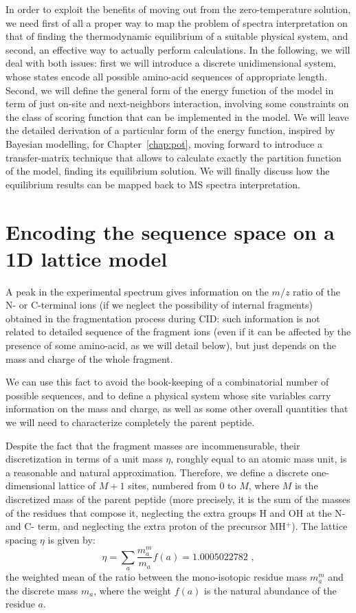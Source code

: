 In order to exploit the benefits of moving out from the zero-temperature
solution, we need first of all a proper way to map the problem of spectra
interpretation on that of finding the thermodynamic equilibrium of a suitable
physical system, and second, an effective way to actually perform calculations.
In the following, we will deal with both issues: first we will introduce a
discrete unidimensional system, whose states encode all possible amino-acid
sequences of appropriate length. Second, we will define the general form of the
energy function of the model in term of just on-site and next-neighbors
interaction, involving some constraints on the  class of scoring function that
can be implemented in the model. We will leave the detailed derivation of a
particular form of the energy function, inspired by Bayesian modelling, for
Chapter~\ref{chap:pot}, moving forward to introduce a transfer-matrix technique that
allows to calculate exactly the partition function of the model, finding its
equilibrium solution. We will finally discuss how the equilibrium results can be
mapped back to  MS spectra interpretation.

\section{Encoding the sequence space on a 1D lattice model}
\label{sec:variables}

A peak in the experimental spectrum gives information on the $m/z$ ratio of the
N- or C-terminal ions (if we neglect the possibility of internal fragments)
obtained in the fragmentation process during CID: such information is not
related to detailed sequence of the fragment ions (even if it can be affected by
the presence of some amino-acid, as we will detail below), but just depends on
the mass and charge of the whole fragment.

We can use this fact to avoid the book-keeping of a combinatorial number of
possible sequences, and to define a physical system whose site variables carry
information on the mass and charge, as well as some other overall quantities
that we will need to characterize completely the parent peptide.
  
Despite the fact that the fragment masses are incommensurable, their
discretization in terms of a unit mass $\eta$, roughly equal to an atomic mass
unit, is a reasonable and natural approximation. Therefore, we define a discrete
one-dimensional lattice  of $M+1$ sites, numbered from $0$ to $M$, where $M$ is
the discretized mass of the parent peptide (more precisely, it is the sum of the
masses of the residues that compose it, neglecting the extra groups H and OH at
the N- and C- term, and neglecting the extra proton of the precursor MH$^+$).
The lattice spacing $\eta$ is given by:
\begin{equation}
\eta=
\sum_{a}\frac{m_{a}^m}{m_{a}}f(a)
=1.0005022782 \,\,,
\end{equation}
the weighted mean of the ratio between the  mono-isotopic residue mass
$m^m_{a}$ and the discrete mass $m_{a}$, where the weight $f(a)$ is the
natural abundance of the residue $a$.

